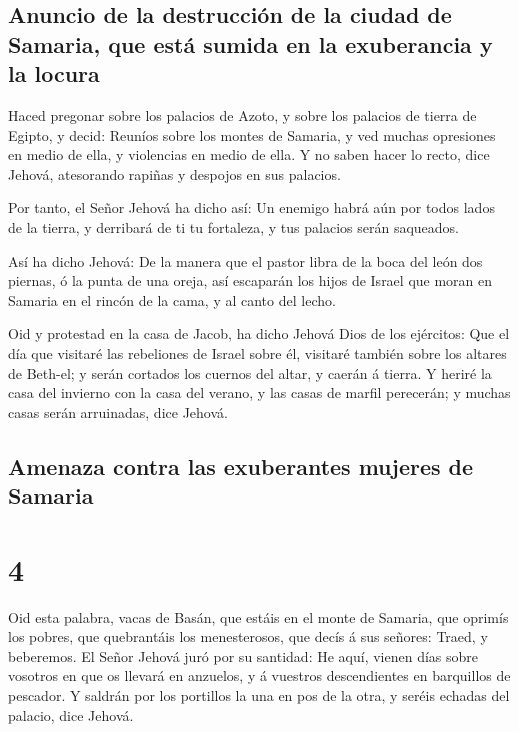 \hypertarget{anuncio-de-la-destrucciuxf3n-de-la-ciudad-de-samaria-que-estuxe1-sumida-en-la-exuberancia-y-la-locura}{%
\subsection{Anuncio de la destrucción de la ciudad de Samaria, que está
sumida en la exuberancia y la
locura}\label{anuncio-de-la-destrucciuxf3n-de-la-ciudad-de-samaria-que-estuxe1-sumida-en-la-exuberancia-y-la-locura}}

 Haced pregonar sobre los palacios de Azoto, y sobre los
palacios de tierra de Egipto, y decid: Reuníos sobre los montes de
Samaria, y ved muchas opresiones en medio de ella, y violencias en medio
de ella.  Y no saben hacer lo recto, dice Jehová,
atesorando rapiñas y despojos en sus palacios.

 Por tanto, el Señor Jehová ha dicho así: Un enemigo habrá
aún por todos lados de la tierra, y derribará de ti tu fortaleza, y tus
palacios serán saqueados.

 Así ha dicho Jehová: De la manera que el pastor libra de
la boca del león dos piernas, ó la punta de una oreja, así escaparán los
hijos de Israel que moran en Samaria en el rincón de la cama, y al canto
del lecho.

 Oid y protestad en la casa de Jacob, ha dicho Jehová Dios
de los ejércitos:  Que el día que visitaré las rebeliones
de Israel sobre él, visitaré también sobre los altares de Beth-el; y
serán cortados los cuernos del altar, y caerán á tierra.  Y
heriré la casa del invierno con la casa del verano, y las casas de
marfil perecerán; y muchas casas serán arruinadas, dice Jehová.

\hypertarget{amenaza-contra-las-exuberantes-mujeres-de-samaria}{%
\subsection{Amenaza contra las exuberantes mujeres de
Samaria}\label{amenaza-contra-las-exuberantes-mujeres-de-samaria}}

\hypertarget{section-3}{%
\section{4}\label{section-3}}

 Oid esta palabra, vacas de Basán, que estáis en el monte de
Samaria, que oprimís los pobres, que quebrantáis los menesterosos, que
decís á sus señores: Traed, y beberemos.  El Señor Jehová
juró por su santidad: He aquí, vienen días sobre vosotros en que os
llevará en anzuelos, y á vuestros descendientes en barquillos de
pescador.  Y saldrán por los portillos la una en pos de la
otra, y seréis echadas del palacio, dice Jehová.

